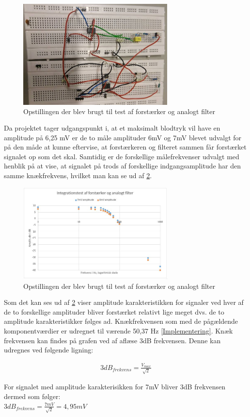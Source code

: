 \begin{figure}[H]
	\centering
	\includegraphics[width=0.7\textwidth]{Figurer/Hardware/samletopstilling}
	\caption{Opstillingen der blev brugt til test af forstærker og analogt filter}
	\label{fig:ForstaerkerFilterOpstiling}
\end{figure}

Da projektet tager udgangspunkt i, at et maksimalt blodtryk vil have en amplitude på 6,25 mV er de to måle amplituder 6mV og 7mV blevet udvalgt for på den måde at kunne eftervise, at forstærkeren og filteret sammen får forstærket signalet op som det skal. Samtidig er de forskellige målefrekvenser udvalgt med henblik på at vise, at signalet på trods af forskellige indgangsamplitude har den samme knækfrekvens, hvilket man kan se ud af \ref{fig:ForstaerkerFilterGraf}.

\begin{figure}[H]
	\centering
	\includegraphics[width=0.7\textwidth]{Figurer/Hardware/IntegrationstestForstaerkerFilter2}
	\caption{Opstillingen der blev brugt til test af forstærker og analogt filter}
	\label{fig:ForstaerkerFilterGraf}
\end{figure}

Som det kan ses ud af \ref{fig:ForstaerkerFilterGraf} viser amplitude karakteristikken for signaler ved hver af de to forskellige amplituder bliver forstærket relativt lige meget dvs. de to amplitude karakteristikker følges ad.
Knækfrekvensen som med de pågældende komponentværdier er udregnet til værende 50,37 Hz \ref{Implementering}. Knæk frekvensen kan findes på grafen ved af aflæse 3dB frekvensen. Denne kan udregnes ved følgende ligning:
\begin{center}
\begin{align}
3dB_{frekvens}=\frac{V_{max}}{\sqrt{2}}
\end{align}
\end{center}
For signalet med amplitude karakterisikken for 7mV bliver 3dB frekvensen dermed som følger:\\
$3dB_{frekvens}=\frac{7mV}{\sqrt{2}}=4,95mV$

